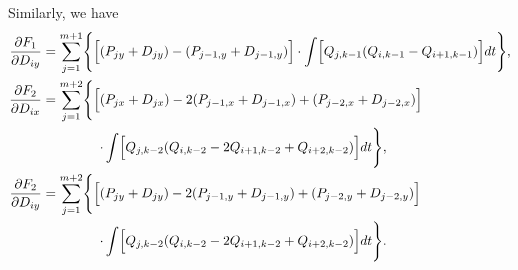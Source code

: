 \documentclass[11pt]{article}
\begin{document}
Similarly, we have
\[
\begin{split}
\frac{\partial{F_1}}{\partial{D_{iy}}}
&= \sum_{j=1}^{m+1}\Biggl\{\Bigl[(P_{jy}+D_{jy})-(P_{j-1,y}+D_{j-1,y})\Bigr] \cdot \int\Bigl[Q_{j,k-1}(Q_{i,k-1}-Q_{i+1,k-1})\Bigr]dt\Biggr\}, \\
\frac{\partial{F_2}}{\partial{D_{ix}}}
&= \sum_{j=1}^{m+2}\Biggl\{\Bigl[(P_{jx}+D_{jx})-2(P_{j-1,x}+D_{j-1,x})+(P_{j-2,x}+D_{j-2,x})\Bigr] \\
&\mathrel{\phantom{=}}\quad\quad\quad\cdot \int\Bigl[Q_{j,k-2}(Q_{i,k-2}-2Q_{i+1,k-2}+Q_{i+2,k-2})\Bigr]dt\Biggr\}, \\
\frac{\partial{F_2}}{\partial{D_{iy}}}
&= \sum_{j=1}^{m+2}\Biggl\{\Bigl[(P_{jy}+D_{jy})-2(P_{j-1,y}+D_{j-1,y})+(P_{j-2,y}+D_{j-2,y})\Bigr] \\
&\mathrel{\phantom{=}}\quad\quad\quad\cdot \int\Bigl[Q_{j,k-2}(Q_{i,k-2}-2Q_{i+1,k-2}+Q_{i+2,k-2})\Bigr]dt\Biggr\}.
\end{split}
\]
\end{document}
